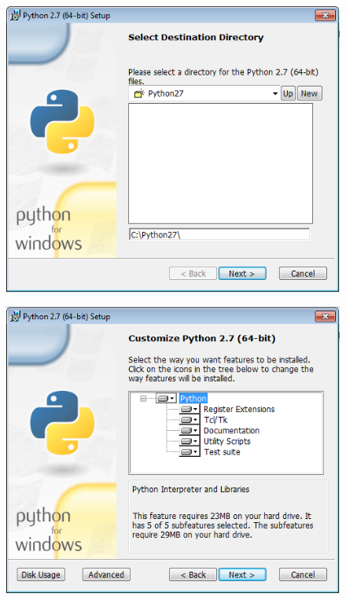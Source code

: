 \documentclass[11pt, spanish]{memoir}
\begin{document}
\begin{figure}[H]
\centering
\includegraphics[width=14cm]{python3.png}
\end{figure}

\begin{figure}[H]
\centering
\includegraphics[width=14cm]{python4.png}
\end{figure}
\end{document}
